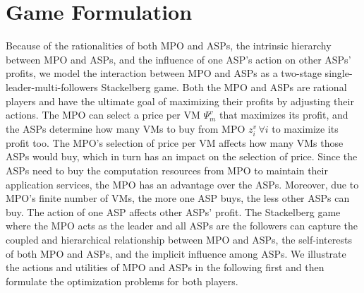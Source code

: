 \documentclass[conference]{IEEEtran}
\begin{document}
\section{Game Formulation}
Because of the rationalities of both MPO and ASPs, the intrinsic hierarchy between MPO and ASPs, and the influence of one ASP's action on other ASPs' profits, we model the interaction between MPO and ASPs as a two-stage single-leader-multi-followers Stackelberg game. Both the MPO and ASPs are rational players and have the ultimate goal of maximizing their profits by adjusting their actions. The MPO can select a price per VM $\Psi_{m}^v$ that maximizes its profit, and the ASPs determine how many VMs to buy from MPO $z_i^v \, \forall i$ to maximize its profit too. The MPO's selection of price per VM affects how many VMs those ASPs would buy, which in turn has an impact on the selection of price. Since the ASPs need to buy the computation resources from MPO to maintain their application services, the MPO has an advantage over the ASPs. Moreover, due to MPO's finite number of VMs, the more one ASP buys, the less other ASPs can buy. The action of one ASP affects other ASPs' profit. The Stackelberg game where the MPO acts as the leader and all ASPs are the followers can capture the coupled and hierarchical relationship between MPO and ASPs, the self-interests of both MPO and ASPs, and the implicit influence among ASPs. We illustrate the actions and utilities of MPO and ASPs in the following first and then formulate the optimization problems for both players. 
\end{document}
